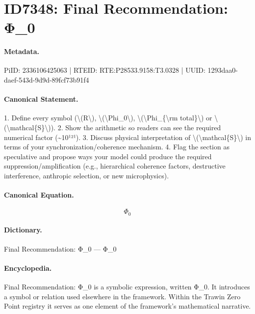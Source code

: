 \section*{ID7348: Final Recommendation: Φ\_0}
\paragraph{Metadata.}
PiID: 2336106425063 | RTEID: RTE:P28533.9158:T3.0328 | UUID: 1293daa0-daef-543d-9d9d-89fcf73b91f4

\paragraph{Canonical Statement.}
1. Define every symbol (\textbackslash{}(R\textbackslash{}), \textbackslash{}(\textbackslash{}Phi\_0\textbackslash{}), \textbackslash{}(\textbackslash{}Phi\_\{\textbackslash{}rm total\}\textbackslash{}) or \textbackslash{}(\textbackslash{}mathcal\{S\}\textbackslash{})). 2. Show the arithmetic so readers can see the required numerical factor (\textasciitilde{}10¹²¹). 3. Discuss physical interpretation of \textbackslash{}(\textbackslash{}mathcal\{S\}\textbackslash{}) in terms of your synchronization/coherence mechanism. 4. Flag the section as speculative and propose ways your model could produce the required suppression/amplification (e.g., hierarchical coherence factors, destructive interference, anthropic selection, or new microphysics).

\paragraph{Canonical Equation.}
\[
\Phi_0
\]

\paragraph{Dictionary.}
Final Recommendation: Φ\_0 — Φ\_0

\paragraph{Encyclopedia.}
Final Recommendation: Φ\_0 is a symbolic expression, written Φ\_0. It introduces a symbol or relation used elsewhere in the framework. Within the Trawin Zero Point registry it serves as one element of the framework's mathematical narrative.
